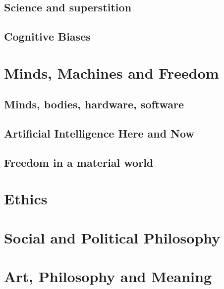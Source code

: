 \documentclass[
  12pt, openany]{book}
\begin{document}
\hypertarget{science-and-superstition}{%
\section{Science and superstition}\label{science-and-superstition}}

\hypertarget{cognitive-biases}{%
\section{Cognitive Biases}\label{cognitive-biases}}

\hypertarget{minds-machines-and-freedom}{%
\chapter{Minds, Machines and Freedom}\label{minds-machines-and-freedom}}

\hypertarget{minds-bodies-hardware-software}{%
\section{Minds, bodies, hardware, software}\label{minds-bodies-hardware-software}}

\hypertarget{artificial-intelligence-here-and-now}{%
\section{Artificial Intelligence Here and Now}\label{artificial-intelligence-here-and-now}}

\hypertarget{freedom-in-a-material-world}{%
\section{Freedom in a material world}\label{freedom-in-a-material-world}}

\hypertarget{ethics}{%
\chapter{Ethics}\label{ethics}}

\hypertarget{social-and-political-philosophy}{%
\chapter{Social and Political Philosophy}\label{social-and-political-philosophy}}

\hypertarget{art-philosophy-and-meaning}{%
\chapter{Art, Philosophy and Meaning}\label{art-philosophy-and-meaning}}
\end{document}
